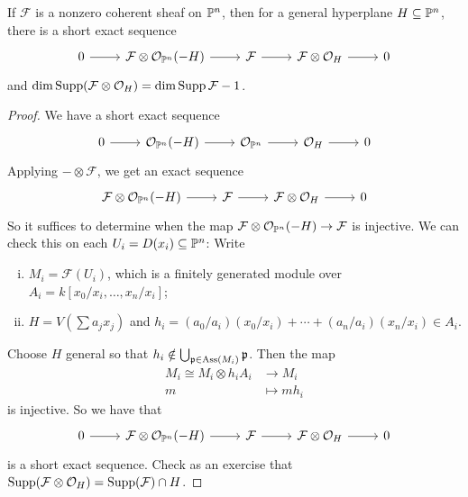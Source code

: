 \begin{prop}\label{prop:hyperplane}
  If $\mathcal{F}$ is a nonzero coherent
  sheaf on $\mathbb{P}^n$, then for a general
  hyperplane $H \subseteq \mathbb{P}^n$, there is a
  short exact sequence
  \[
    \begin{tikzcd}
      0 \ar[r] & \mathcal{F} \otimes \OO_{\PP^n}(-H)
      \ar[r] & \mathcal{F} \ar[r] & \mathcal{F} \otimes \OO_H \ar[r] & 0
    \end{tikzcd}
  \]
  and
  $\dim \operatorname{Supp}(\mathcal{F} \otimes \mathcal{O}_H) = \dim \operatorname{Supp} \mathcal{F} - 1$.
\end{prop}

\begin{proof}
  We have a short exact sequence
  \[
    \begin{tikzcd}
      0 \ar[r] & \OO_{\PP^n}(-H)
      \ar[r] & \OO_{\PP^n} \ar[r] & \OO_H \ar[r] & 0
    \end{tikzcd}
  \]
  Applying $- \otimes \mathcal{F}$,
  we get an exact sequence
  \[
    \begin{tikzcd}
      \mathcal{F} \otimes \OO_{\PP^n}(-H) \ar[r] & \mathcal{F} \ar[r] & \mathcal{F} \otimes \OO_H \ar[r] & 0
    \end{tikzcd}
  \]
  So it suffices to determine when the map
  $\mathcal{F} \otimes \mathcal{O}_{\mathbb{P}^n}(-H) \to \mathcal{F}$
  is injective. We can check this on each
  $U_i = D(x_i) \subseteq \mathbb{P}^n$:
  Write
  \begin{enumerate}[(i)]
    \item $M_i = \mathcal{F}(U_i)$,
      which is a finitely generated module over
      $A_i = k[x_0 / x_i, \dots, x_n / x_i]$;
    \item $H = V(\sum a_j x_j)$ and
      $h_i = (a_0 / a_i)(x_0 / x_i) + \cdots + (a_n / a_i)(x_n / x_i) \in A_i$.
  \end{enumerate}
  Choose $H$ general so that
  $h_i \notin \bigcup_{\mathfrak{p} \in \operatorname{Ass}(M_i)} \mathfrak{p}$.
  Then the map
  \begin{align*}
    M_i \cong M_i \otimes h_i A_i
    &\longrightarrow M_i \\
    m &\longmapsto m h_i
  \end{align*}
  is injective. So we have that
  \[
    \begin{tikzcd}
      0 \ar[r] & \mathcal{F} \otimes \OO_{\PP^n}(-H) \ar[r] & \mathcal{F} \ar[r] & \mathcal{F} \otimes \OO_H \ar[r] & 0
    \end{tikzcd}
  \]
  is a short exact sequence.
  Check as an exercise that
  $\operatorname{Supp}(\mathcal{F} \otimes \mathcal{O}_H) = \operatorname{Supp}(\mathcal{F}) \cap H$.
\end{proof}

